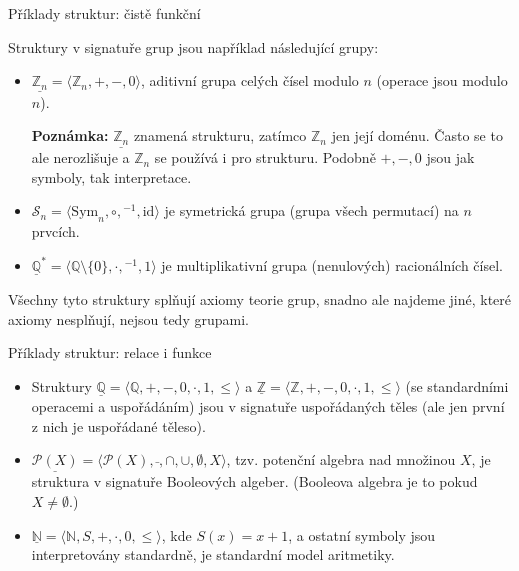 \documentclass{beamer}
\begin{document}
\begin{frame}{Příklady struktur: čistě funkční}
    
    Struktury \alert{v signatuře grup} jsou například následující \alert{grupy}:
        \begin{itemize}
            \item $\underline{\mathbb Z_n}=\langle\mathbb Z_n,+,-,0\rangle$, \alert{aditivní grupa celých čísel modulo $n$} (operace jsou modulo $n$). 
            
            \smallskip
            
            \textbf{Poznámka:} $\underline{\mathbb Z_n}$ znamená strukturu, zatímco $\mathbb Z_n$ jen její doménu. Často se to ale nerozlišuje a $\mathbb Z_n$ se používá i pro strukturu. Podobně $+,-,0$ jsou jak symboly, tak interpretace.

            \smallskip

            \item $\mathcal S_n=\langle \mathrm{Sym}_n,\circ,{}^{-1},\mathrm{id}\rangle$ je \alert{symetrická grupa} (grupa všech permutací) na $n$ prvcích.
            \item $\underline{\mathbb Q}^*=\langle \mathbb Q\setminus\{0\},\cdot,{}^{-1},1\rangle$ je \alert{multiplikativní grupa (nenulových) racionálních čísel}. 
        \end{itemize}
        Všechny tyto struktury \alert{splňují axiomy teorie grup}, snadno ale najdeme jiné, které axiomy nesplňují, nejsou tedy grupami.
    

\end{frame}


\begin{frame}{Příklady struktur: relace i funkce}
    
    \begin{itemize}
        \item Struktury $\underline{\mathbb Q}=\langle \mathbb Q, +, -, 0,\cdot,1,\leq\rangle$ a $\underline{\mathbb Z}=\langle \mathbb Z, +, -, 0,\cdot,1,\leq\rangle$ (se standardními operacemi a uspořádáním) jsou \alert{v signatuře uspořádaných těles} (ale jen první z nich je uspořádané těleso).
        \item $\underline{\mathcal P(X)}=\langle \mathcal P(X),\bar{},\cap,\cup,\emptyset,X\rangle$, tzv. \alert{potenční algebra} nad množinou $X$, je struktura \alert{v signatuře Booleových algeber}. (\alert{Booleova algebra} je to pokud $X\neq\emptyset$.)
        \item $\underline{\mathbb N}=\langle \mathbb N,S,+,\cdot,0,\leq\rangle$, kde $S(x)=x+1$, a ostatní symboly jsou interpretovány standardně, je \alert{standardní model aritmetiky}.
    \end{itemize}

\end{frame}
\end{document}
